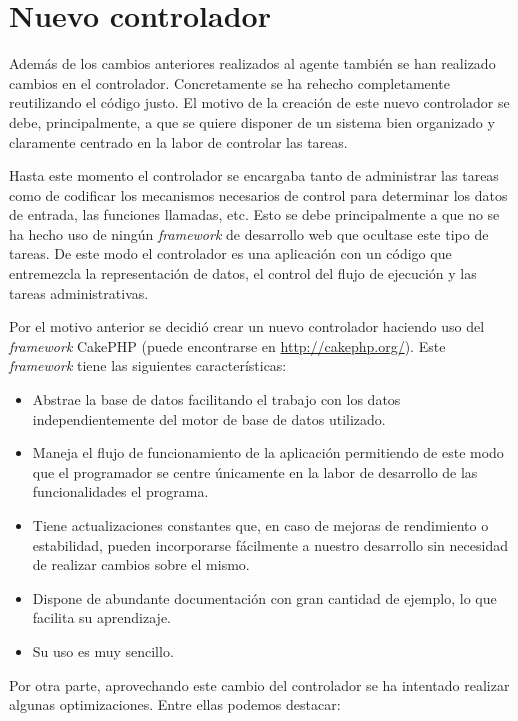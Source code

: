 \section{Nuevo controlador}

Además de los cambios anteriores realizados al agente también se han realizado cambios en el controlador. Concretamente se ha rehecho completamente reutilizando el código justo. El motivo de la creación de este nuevo controlador se debe, principalmente, a que se quiere disponer de un sistema bien organizado y claramente centrado en la labor de controlar las tareas.

Hasta este momento el controlador se encargaba tanto de administrar las tareas como de codificar los mecanismos necesarios de control para determinar los datos de entrada, las funciones llamadas, etc. Esto se debe principalmente a que no se ha hecho uso de ningún \emph{framework} de desarrollo web que ocultase este tipo de tareas. De este modo el controlador es una aplicación con un código que entremezcla la representación de datos, el control del flujo de ejecución y las tareas administrativas.

Por el motivo anterior se decidió crear un nuevo controlador haciendo uso del \emph{framework} CakePHP (puede encontrarse en \url{http://cakephp.org/}). Este \emph{framework} tiene las siguientes características:

\begin{itemize}
	\item Abstrae la base de datos facilitando el trabajo con los datos independientemente del motor de base de datos utilizado.
	
	\item Maneja el flujo de funcionamiento de la aplicación permitiendo de este modo que el programador se centre únicamente en la labor de desarrollo de las funcionalidades el programa.
	
	\item Tiene actualizaciones constantes que, en caso de mejoras de rendimiento o estabilidad, pueden incorporarse fácilmente a nuestro desarrollo sin necesidad de realizar cambios sobre el mismo.
	
	\item Dispone de abundante documentación con gran cantidad de ejemplo, lo que facilita su aprendizaje.
	
	\item Su uso es muy sencillo.
\end{itemize}

Por otra parte, aprovechando este cambio del controlador se ha intentado realizar algunas optimizaciones. Entre ellas podemos destacar:

